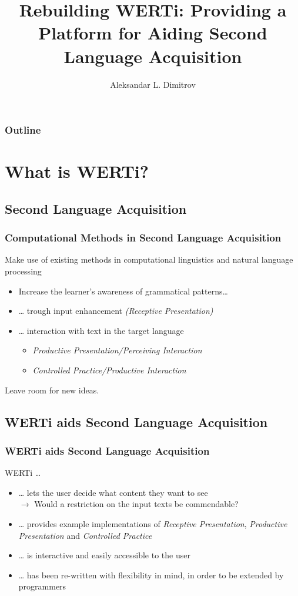 \documentclass{beamer}
\title{Rebuilding WERTi: Providing a Platform for Aiding Second Language Acquisition}
\institute{Universität Tübingen}
\author{Aleksandar L. Dimitrov}
\begin{document}
\begin{frame}
  \titlepage
\end{frame}

\begin{frame}
  \frametitle{Outline}
  \tableofcontents
\end{frame}

\section{What is WERTi?}

\subsection{Second Language Acquisition}
\begin{frame}
  \frametitle{Computational Methods in Second Language Acquisition}
  Make use of existing methods in computational linguistics and natural language
  processing\pause
  \begin{itemize}
    \item Increase the learner's awareness of grammatical patterns\ldots{}\pause
    \item \ldots{} trough input enhancement\pause\emph{ (Receptive Presentation) }\pause
    \item \ldots{} interaction with text in the target language\pause
      \begin{itemize}
	\item \emph{Productive Presentation/Perceiving Interaction}\pause
	\item \emph{Controlled Practice/Productive Interaction}\pause
      \end{itemize}
  \end{itemize}
  Leave room for new ideas.\pause
\end{frame}

\subsection{WERTi aids Second Language Acquisition}
\begin{frame}
  \frametitle{WERTi aids Second Language Acquisition}
  WERTi \ldots
  \begin{itemize}
    \item \ldots{} lets the user decide what content they want to see\pause\\
      $\to$ Would a restriction on the input texts be commendable?\pause
    \item \ldots{} provides example implementations of \emph{Receptive Presentation},
      \emph{Productive Presentation} and \emph{Controlled Practice}\pause
    \item \ldots{} is interactive and easily accessible to the user\pause
    \item \ldots{} has been re-written with flexibility in mind, in order to be
      extended by programmers\pause
  \end{itemize}
\end{frame}
\end{document}
